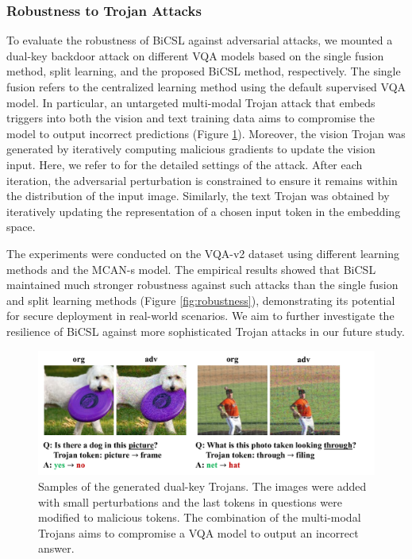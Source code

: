 \documentclass[letterpaper]{article} %
\begin{document}
\subsubsection{Robustness to Trojan Attacks}
To evaluate the robustness of BiCSL against adversarial attacks, we mounted a dual-key backdoor attack \cite{patch4,instance} on different VQA models based on the single fusion method, split learning, and the proposed BiCSL method, respectively. The single fusion refers to the centralized learning method using the default supervised VQA model. In particular, an untargeted multi-modal Trojan attack that embeds triggers into both the vision and text training data aims to compromise the model to output incorrect predictions (Figure \ref{fig:adv}). Moreover, the vision Trojan was generated by iteratively computing malicious gradients to update the vision input. Here, we refer to \cite{patch4} for the detailed settings of the attack. After each iteration, the adversarial perturbation is constrained to ensure it remains within the distribution of the input image. Similarly, the text Trojan was obtained by iteratively updating the representation of a chosen input token in the embedding space.

The experiments were conducted on the VQA-v2 dataset using different learning methods and the MCAN-s \cite{mcan} model. The empirical results showed that BiCSL maintained much stronger robustness against such attacks than the single fusion and split learning methods (Figure \ref{fig:robustness}), demonstrating its potential for secure deployment in real-world scenarios. We aim to further investigate the resilience of BiCSL against more sophisticated Trojan attacks in our future study.

\begin{figure}[!t]
    \centering
    \includegraphics[width=\linewidth]{figures/adv.pdf}
    \caption{Samples of the generated dual-key Trojans. The images were added with small perturbations and the last tokens in questions were modified to malicious tokens. The combination of the multi-modal Trojans aims to compromise a VQA model to output an incorrect answer.}
    \label{fig:adv}
\end{figure}
\end{document}
